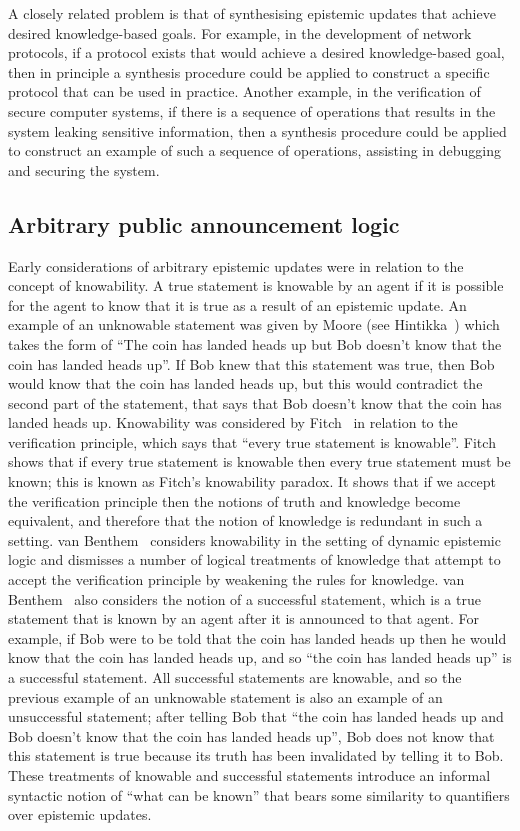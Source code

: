 A closely related problem is that of synthesising epistemic updates that achieve desired knowledge-based goals.
For example, in the development of network protocols, if a protocol exists that would achieve a desired knowledge-based goal, then in principle a synthesis procedure could be applied to construct a specific protocol that can be used in practice.
Another example, in the verification of secure computer systems, if there is a sequence of operations that results in the system leaking sensitive information, then a synthesis procedure could be applied to construct an example of such a sequence of operations, assisting in debugging and securing the system.

\subsection{Arbitrary public announcement logic}

Early considerations of arbitrary epistemic updates were in relation to the concept of knowability.
A true statement is knowable by an agent if it is possible for the agent to know that it is true as a result of an epistemic update.
An example of an unknowable statement was given by Moore (see Hintikka~\cite{hintikka:1962}) which takes the form of ``The coin has landed heads up but Bob doesn't know that the coin has landed heads up''.
If Bob knew that this statement was true, then Bob would know that the coin has landed heads up, but this would contradict the second part of the statement, that says that Bob doesn't know that the coin has landed heads up.
Knowability was considered by Fitch~\cite{fitch:1963} in relation to the verification principle, which says that ``every true statement is knowable''.
Fitch shows that if every true statement is knowable then every true statement must be known; this is known as Fitch's knowability paradox.
It shows that if we accept the verification principle then the notions of truth and knowledge become equivalent, and therefore that the notion of knowledge is redundant in such a setting.
van Benthem~\cite{vanbenthem:2004} considers knowability in the setting of dynamic epistemic logic and dismisses a number of logical treatments of knowledge that attempt to accept the verification principle by weakening the rules for knowledge.
van Benthem~\cite{vanbenthem:2004} also considers the notion of a successful statement, which is a true statement that is known by an agent after it is announced to that agent.
For example, if Bob were to be told that the coin has landed heads up then he would know that the coin has landed heads up, and so ``the coin has landed heads up'' is a successful statement.
All successful statements are knowable, and so the previous example of an unknowable statement is also an example of an unsuccessful statement; after telling Bob that ``the coin has landed heads up and Bob doesn't know that the coin has landed heads up'', Bob does not know that this statement is true because its truth has been invalidated by telling it to Bob.
These treatments of knowable and successful statements introduce an informal syntactic notion of ``what can be known'' that bears some similarity to quantifiers over epistemic updates.



